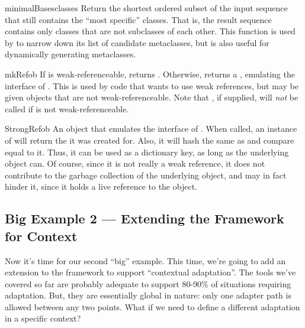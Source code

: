 \begin{verbatim%
}
\begin{verbatim%
}
\begin{verbatim%
}
\begin{verbatim%
}
\begin{verbatim%
}
\begin{verbatim%
}
\begin{funcdesc}{minimalBases}{classes}
Return the shortest ordered subset of the input sequence  that
still contains the ``most specific'' classes.  That is, the result sequence
contains only classes that are not subclasses of each other.  This function is
used by  to narrow down its list of candidate
metaclasses, but is also useful for dynamically generating metaclasses.
\end{funcdesc}



\begin{funcdesc}{mkRef}{ob }
If  is weak-referenceable, returns
.  Otherwise, returns a
, emulating the interface of .
This is used by code that wants to use weak references, but may be given
objects that are not weak-referenceable.  Note that , if
supplied, will \emph{not} be called if  is not weak-referenceable.
\end{funcdesc}

\begin{classdesc}{StrongRef}{ob}
An object that emulates the interface of .  When called,
an instance of  will return the  it was created for.
Also, it will hash the same as  and compare equal to it.  Thus, it
can be used as a dictionary key, as long as the underlying object can.  Of
course, since it is not really a weak reference, it does not contribute to the
garbage collection of the underlying object, and may in fact hinder it, since
it holds a live reference to the object.
\end{classdesc}




\subsection{Big Example 2 --- Extending the Framework for Context\label{protocols-context}}

Now it's time for our second ``big'' example.  This time, we're going to add
an extension to the  framework to support ``contextual
adaptation''.  The tools we've covered so far are probably adequate to support
80-90\% of situations requiring adaptation.  But, they are essentially global
in nature: only one adapter path is allowed between any two points.  What if we
need to define a different adaptation in a specific context?


\end{verbatim%
}
\end{verbatim%
}
\end{verbatim%
}
\end{verbatim%
}
\end{verbatim%
}
\end{verbatim%
}
